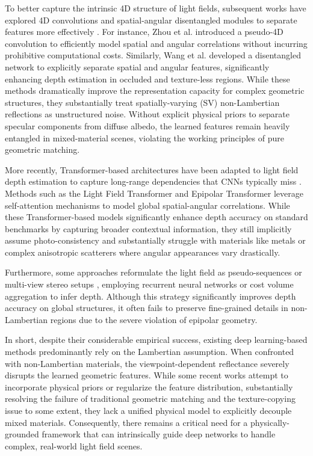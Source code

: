 \documentclass[lettersize,journal]{IEEEtran}
\begin{document}
To better capture the intrinsic 4D structure of light fields, subsequent works have explored 4D convolutions and spatial-angular disentangled modules to separate features more effectively \cite{dd}. For instance, Zhou et al. \cite{lflf} introduced a pseudo-4D convolution to efficiently model spatial and angular correlations without incurring prohibitive computational costs. Similarly, Wang et al. \cite{distgnetdistg} developed a disentangled network to explicitly separate spatial and angular features, significantly enhancing depth estimation in occluded and texture-less regions. While these methods dramatically improve the representation capacity for complex geometric structures, they substantially treat spatially-varying (SV) non-Lambertian reflections as unstructured noise. Without explicit physical priors to separate specular components from diffuse albedo, the learned features remain heavily entangled in mixed-material scenes, violating the working principles of pure geometric matching.

More recently, Transformer-based architectures have been adapted to light field depth estimation to capture long-range dependencies that CNNs typically miss \cite{longlong}. Methods such as the Light Field Transformer \cite{lightlight_25} and Epipolar Transformer \cite{epipolarepipo_26} leverage self-attention mechanisms to model global spatial-angular correlations. While these Transformer-based models significantly enhance depth accuracy on standard benchmarks by capturing broader contextual information, they still implicitly assume photo-consistency and substantially struggle with materials like metals or complex anisotropic scatterers where angular appearances vary drastically.

Furthermore, some approaches reformulate the light field as pseudo-sequences or multi-view stereo setups \cite{pseudopseud}, employing recurrent neural networks or cost volume aggregation to infer depth. Although this strategy significantly improves depth accuracy on global structures, it often fails to preserve fine-grained details in non-Lambertian regions due to the severe violation of epipolar geometry.

In short, despite their considerable empirical success, existing deep learning-based methods predominantly rely on the Lambertian assumption. When confronted with non-Lambertian materials, the viewpoint-dependent reflectance severely disrupts the learned geometric features. While some recent works attempt to incorporate physical priors or regularize the feature distribution, substantially resolving the failure of traditional geometric matching and the texture-copying issue to some extent, they lack a unified physical model to explicitly decouple mixed materials. Consequently, there remains a critical need for a physically-grounded framework that can intrinsically guide deep networks to handle complex, real-world light field scenes.
\end{document}
